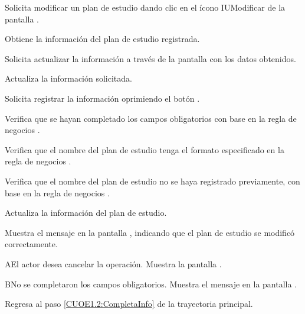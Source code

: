 \begin{UCtrayectoria}
	\UCpaso [\UCactor] Solicita modificar un plan de estudio dando clic en el ícono IUModificar de la pantalla . 
	
	\UCpaso [\UCsist] Obtiene la información del plan de estudio registrada.
	
	\UCpaso [\UCsist] Solicita actualizar la información a través de la pantalla  con los datos obtenidos.
	
	\UCpaso [\UCactor] Actualiza la información solicitada. \label{CUOE1.2:CompletaInfo}
	
	\UCpaso [\UCactor] Solicita registrar la información oprimiendo el botón . 
	
	\UCpaso [\UCsist] Verifica que se hayan completado los campos obligatorios con base en la regla de negocios . 
	
	\UCpaso [\UCsist] Verifica que el nombre del plan de estudio tenga el formato especificado en la regla de negocios . 
	
	\UCpaso [\UCsist] Verifica que el nombre del plan de estudio no se haya registrado previamente, con base en la regla de negocios . 
	
	\UCpaso [\UCsist] Actualiza la información del plan de estudio.
	
	\UCpaso [\UCsist] Muestra el mensaje  en la pantalla , indicando que el plan de estudio se modificó correctamente.	
	
\end{UCtrayectoria}

\begin{UCtrayectoriaA}{A}{El actor desea cancelar la operación.}
	\UCpaso [\UCsist] Muestra la pantalla . 
\end{UCtrayectoriaA}

\begin{UCtrayectoriaA}{B}{No se completaron los campos obligatorios.}
	\UCpaso [\UCsist] Muestra el mensaje  en la pantalla .
	
	\UCpaso Regresa al paso \ref{CUOE1.2:CompletaInfo} de la trayectoria principal.
\end{UCtrayectoriaA}

